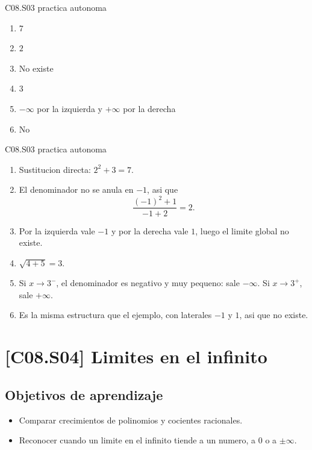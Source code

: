 \begin{shortanswer}{C08.S03 practica autonoma}
\begin{enumerate}[label=\textbf{PX-C08.S03-\arabic*:}, leftmargin=*]
  \item \(7\)
  \item \(2\)
  \item No existe
  \item \(3\)
  \item \(-\infty\) por la izquierda y \(+\infty\) por la derecha
  \item No
\end{enumerate}
\end{shortanswer}

\begin{fullsolution}{C08.S03 practica autonoma}
\begin{enumerate}[label=\textbf{PX-C08.S03-\arabic*:}, leftmargin=*]
  \item Sustitucion directa: \(2^2+3=7\).
  \item El denominador no se anula en \(-1\), asi que
  \[
  \frac{(-1)^2+1}{-1+2}=2.
  \]
  \item Por la izquierda vale \(-1\) y por la derecha vale \(1\), luego el limite global no
  existe.
  \item \(\sqrt{4+5}=3\).
  \item Si \(x\to 3^-\), el denominador es negativo y muy pequeno: sale \(-\infty\). Si
  \(x\to 3^+\), sale \(+\infty\).
  \item Es la misma estructura que el ejemplo, con laterales \(-1\) y \(1\), asi que no existe.
\end{enumerate}
\end{fullsolution}

\section{[C08.S04] Limites en el infinito}

\subsection*{Objetivos de aprendizaje}
\begin{itemize}
  \item Comparar crecimientos de polinomios y cocientes racionales.
  \item Reconocer cuando un limite en el infinito tiende a un numero, a \(0\) o a \(\pm\infty\).
\end{itemize}

